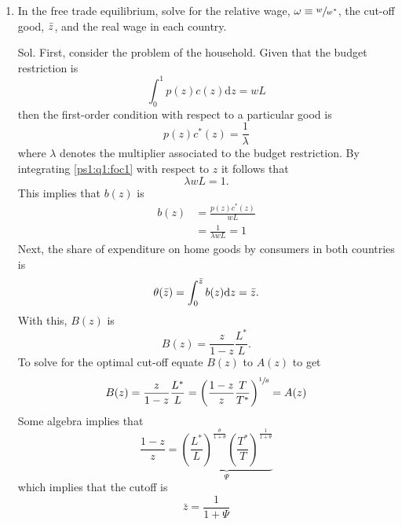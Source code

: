\documentclass{article}
\begin{document}
\begin{enumerate}
    \item In the free trade equilibrium, solve for the relative wage, $\omega \equiv \sfrac{w}{w^*}$, the cut-off good, $\Bar{z}$, and the real wage in each country.
    \item[Sol.] First, consider the problem of the household. Given that the budget restriction is 
    \begin{equation*}
        \int_0^1p(z)c(z)\mathrm{d}z = wL
    \end{equation*}
    then the first-order condition with respect to a particular good is 
    \begin{equation}\label{ps1:q1:foc1}
        p(z)c^*(z) = \frac{1}{\lambda}
    \end{equation}
    where $\lambda$ denotes the multiplier associated to the budget restriction. By integrating \eqref{ps1:q1:foc1} with respect to $z$ it follows that 
    \begin{equation*}
        \lambda wL =1.
    \end{equation*}
    This implies that $b(z)$ is 
    \begin{align*}
        b(z) &= \frac{p(z)c^*(z)}{wL} \\ 
             &= \frac{1}{\lambda wL} = 1
    \end{align*}
    Next, the share of expenditure on home goods by consumers in both countries is 
    \begin{equation*}
        \theta(\bar{z}) = \int_0^{\Bar{z}} b(z)\mathrm{d}z = \Bar{z}.
    \end{equation*}
    With this, $B(z)$ is 
    \begin{equation*}
        B(z) = \frac{z}{1-z}\frac{L^*}{L}.
    \end{equation*}
    To solve for the optimal cut-off equate $B(z)$ to $A(z)$ to get 
    \begin{equation*}
        B(z) = \frac{z}{1-z}\frac{L^*}{L} = \left(\frac{1-z}{z}\frac{T}{T^*}\right)^{\sfrac{1}{\theta}} = A(z)
    \end{equation*}
    Some algebra implies that 
    \begin{equation*}
        \frac{1-z}{z} = \underbrace{\left(\frac{L^*}{L}\right)^{\frac{\theta}{1+\theta}} \left(\frac{T^*}{T}\right)^{\frac{1}{1+\theta}}}_{\Psi}
    \end{equation*}
    which implies that the cutoff is 
    \begin{equation}
        \bar{z} = \frac{1}{1+\Psi}
    \end{equation}

\end{enumerate}
\end{document}
